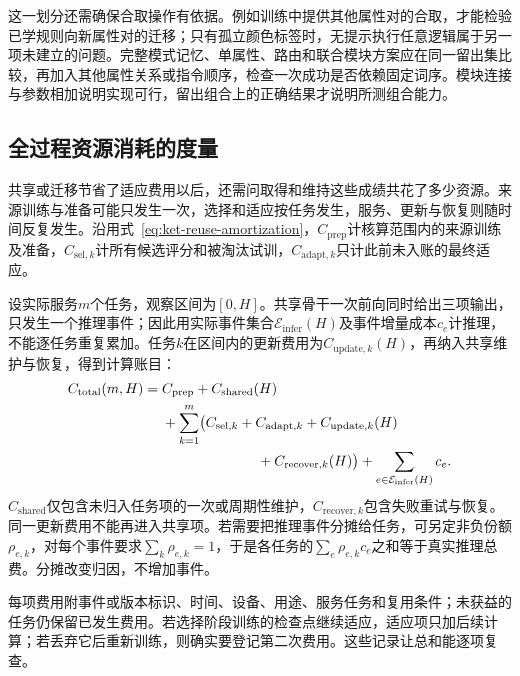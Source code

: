 这一划分还需确保合取操作有依据。例如训练中提供其他属性对的合取，才能检验已学规则向新属性对的迁移；只有孤立颜色标签时，无提示执行任意逻辑属于另一项未建立的问题。完整模式记忆、单属性、路由和联合模块方案应在同一留出集比较，再加入其他属性关系或指令顺序，检查一次成功是否依赖固定词序。模块连接与参数相加说明实现可行，留出组合上的正确结果才说明所测组合能力。

\subsection{全过程资源消耗的度量}
\label{sec:ket-evaluation-resources}

共享或迁移节省了适应费用以后，还需问取得和维持这些成绩共花了多少资源。来源训练与准备可能只发生一次，选择和适应按任务发生，服务、更新与恢复则随时间反复发生。沿用式~\eqref{eq:ket-reuse-amortization}，$C_{\mathrm{prep}}$计核算范围内的来源训练及准备，$C_{\mathrm{sel},k}$计所有候选评分和被淘汰试训，$C_{\mathrm{adapt},k}$只计此前未入账的最终适应。

设实际服务$m$个任务，观察区间为$[0,H]$。共享骨干一次前向同时给出三项输出，只发生一个推理事件；因此用实际事件集合$\mathcal E_{\mathrm{infer}}(H)$及事件增量成本$c_e$计推理，不能逐任务重复累加。任务$k$在区间内的更新费用为$C_{\mathrm{update},k}(H)$，再纳入共享维护与恢复，得到计算账目：
\begin{equation}
  \begin{aligned}
    C_{\mathrm{total}}(m,H)
    ={}&C_{\mathrm{prep}}+C_{\mathrm{shared}}(H)\\
       &+\sum_{k=1}^{m}\bigl(
        C_{\mathrm{sel},k}+C_{\mathrm{adapt},k}
        +C_{\mathrm{update},k}(H)\\
       &\hspace{24mm}+C_{\mathrm{recover},k}(H)\bigr)
        +\sum_{e\in\mathcal E_{\mathrm{infer}}(H)}c_e.
  \end{aligned}
  \label{eq:ket-evaluation-ledger}
\end{equation}
$C_{\mathrm{shared}}$仅包含未归入任务项的一次或周期性维护，$C_{\mathrm{recover},k}$包含失败重试与恢复。同一更新费用不能再进入共享项。若需要把推理事件分摊给任务，可另定非负份额$\rho_{e,k}$，对每个事件要求$\sum_k\rho_{e,k}=1$，于是各任务的$\sum_e\rho_{e,k}c_e$之和等于真实推理总费。分摊改变归因，不增加事件。

每项费用附事件或版本标识、时间、设备、用途、服务任务和复用条件；未获益的任务仍保留已发生费用。若选择阶段训练的检查点继续适应，适应项只加后续计算；若丢弃它后重新训练，则确实要登记第二次费用。这些记录让总和能逐项复查。

